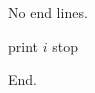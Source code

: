 \documentclass{article}
\begin{document}
No end lines.

\begin{algorithm}[h]
\caption{Without end}
\begin{algorithmic}[1]
\State print $i$
\EndIf
\EndFor
\State stop
\end{algorithmic}
\end{algorithm}

End.
\end{document}
